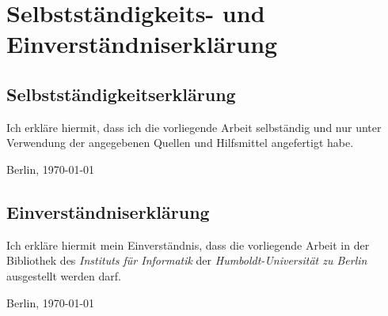 
\chapter*{Selbstständigkeits- und Einverständniserklärung}

\section*{Selbstständigkeitserklärung}

Ich erkläre hiermit, dass ich die vorliegende Arbeit selbständig und
nur unter Verwendung der angegebenen Quellen und Hilfsmittel
angefertigt habe.

\vspace*{1.8cm}

Berlin, \today

\section*{Einverständniserklärung}

Ich erkläre hiermit mein Einverständnis, dass die vorliegende Arbeit
in der Bibliothek des \textit{Instituts für Informatik} der
\textit{Humboldt-Universität zu Berlin} ausgestellt werden darf.

\vspace*{1.8cm}

Berlin, \today


